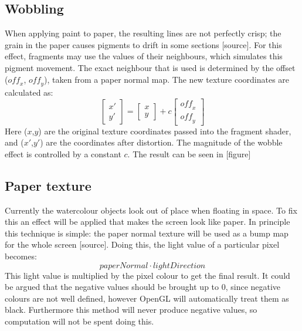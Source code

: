 \documentclass[a4paper, 12pt]{article}
\begin{document}
\subsection{Wobbling}
When applying paint to paper, the resulting lines are not perfectly crisp; the grain in the paper causes pigments to drift in some sections [source]. For this effect, fragments may use the values of their neighbours, which simulates this pigment movement. The exact neighbour that is used is determined by the offset ($\mathit{off}_x$, $\mathit{off}_y$), taken from a paper normal map. The new texture coordinates are calculated as:
$$\begin{bmatrix}x'\\y'\end{bmatrix} = \begin{bmatrix}x\\y\end{bmatrix} + c\begin{bmatrix}\mathit{off}_x\\\mathit{off}_y\end{bmatrix}$$
Here ($x$,$y$) are the original texture coordinates passed into the fragment shader, and ($x'$,$y'$) are the coordinates after distortion. The magnitude of the wobble effect is controlled by a constant $c$. The result can be seen in [figure]


\subsection{Paper texture}
Currently the watercolour objects look out of place when floating in space. To fix this an effect will be applied that makes the screen look like paper. In principle this technique is simple: the paper normal texture will be used as a bump map for the whole screen [source]. Doing this, the light value of a particular pixel becomes:
$$\mathit{paperNormal} \cdot \mathit{lightDirection}$$
This light value is multiplied by the pixel colour to get the final result. It could be argued that the negative values should be brought up to 0, since negative colours are not well defined, however OpenGL will automatically treat them as black. Furthermore this method will never produce negative values, so computation will not be spent doing this.
\end{document}
